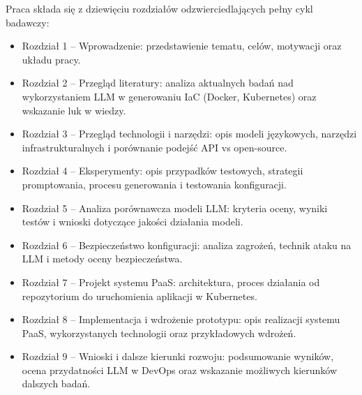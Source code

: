 Praca składa się z dziewięciu rozdziałów odzwierciedlających pełny cykl badawczy:
\begin{itemize}
    \item Rozdział 1 – Wprowadzenie: przedstawienie tematu, celów, motywacji oraz układu pracy.
    \item Rozdział 2 – Przegląd literatury: analiza aktualnych badań nad wykorzystaniem LLM w generowaniu IaC (Docker, Kubernetes) oraz wskazanie luk w wiedzy.
    \item Rozdział 3 – Przegląd technologii i narzędzi: opis modeli językowych, narzędzi infrastrukturalnych i porównanie podejść API vs open-source.
    \item Rozdział 4 – Eksperymenty: opis przypadków testowych, strategii promptowania, procesu generowania i testowania konfiguracji.
    \item Rozdział 5 – Analiza porównawcza modeli LLM: kryteria oceny, wyniki testów i wnioski dotyczące jakości działania modeli.
    \item Rozdział 6 – Bezpieczeństwo konfiguracji: analiza zagrożeń, technik ataku na LLM i metody oceny bezpieczeństwa.
    \item Rozdział 7 – Projekt systemu PaaS: architektura, proces działania od repozytorium do uruchomienia aplikacji w Kubernetes.
    \item Rozdział 8 – Implementacja i wdrożenie prototypu: opis realizacji systemu PaaS, wykorzystanych technologii oraz przykładowych wdrożeń.
    \item Rozdział 9 – Wnioski i dalsze kierunki rozwoju: podsumowanie wyników, ocena przydatności LLM w DevOps oraz wskazanie możliwych kierunków dalszych badań.
\end{itemize}

